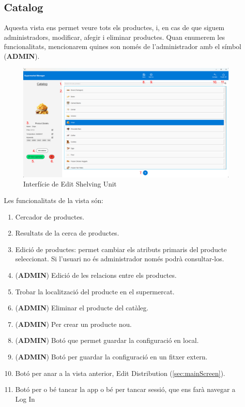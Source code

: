\documentclass[a4paper,12pt]{article}
\begin{document}
	\newpage
	\subsection{Catalog}
	\label{sec:catalog}
	
	Aquesta vista ens permet veure tots els productes, i, en cas de que siguem administradors, modificar, afegir i eliminar productes. Quan enumerem les funcionalitats, mencionarem quines son només de l'administrador amb el símbol (\textbf{ADMIN}).
	
	\begin{figure}[H] 
		\centering
		\includegraphics[width=0.75\linewidth]{assets/catalog.png}
		\caption{Interfície de Edit Shelving Unit}
	\end{figure}
	
	\noindent Les funcionalitats de la vista són:
	
	\begin{enumerate}[itemsep=0pt, topsep=0pt]
		\item Cercador de productes.
		\item Resultats de la cerca de productes.
		\item Edició de productes: permet cambiar els atributs primaris del producte seleccionat. Si l'usuari no és administrador només podrà consultar-los.
		\item (\textbf{ADMIN}) Edició de les relacions entre els productes.
		\item Trobar la localització del producte en el supermercat.
		\item (\textbf{ADMIN}) Eliminar el producte del catàleg.
		\item (\textbf{ADMIN}) Per crear un producte nou.
		\item (\textbf{ADMIN}) Botó que permet guardar la configuració en local.
		\item (\textbf{ADMIN}) Botó per guardar la configuració en un fitxer extern.
		\item Botó per anar a la vista anterior, Edit Distribution (\ref{sec:mainScreen}).
		\item Botó per o bé tancar la app o bé per tancar sessió, que ens farà navegar a Log In
	\end{enumerate}
	
\end{document}
